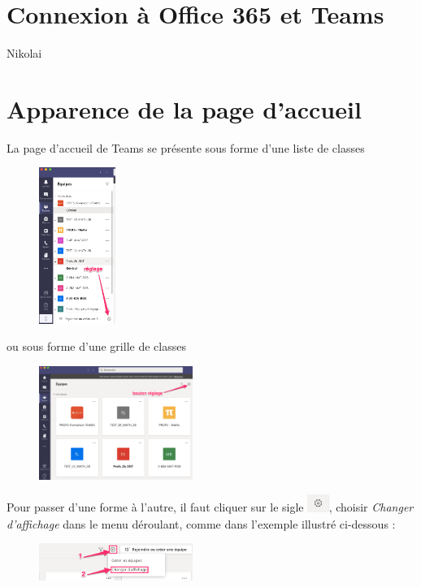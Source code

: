 \documentclass{article}
\begin{document}
\section{Connexion à Office 365 et Teams}

Nikolai

\section{Apparence de la page d'accueil}

La page d'accueil de Teams se présente sous forme d'une liste de classes 

\begin{figure}[h]
\includegraphics[width=2.5cm]{accueil_liste.png}
\centering
\end{figure}

ou sous forme d'une grille de classes 

\begin{figure}[h]
\includegraphics[width=5cm]{accueil_grille.png}
\centering
\end{figure}

Pour passer d'une forme à l'autre, il faut cliquer sur le sigle \includegraphics[width=0.7cm]{bouton_parametres.png}, choisir \textit{Changer d'affichage} dans le menu déroulant, comme dans l'exemple illustré ci-dessous :

\begin{figure}[h]
\includegraphics[width=5cm]{changement_liste.png}
\centering
\end{figure}
\end{document}
